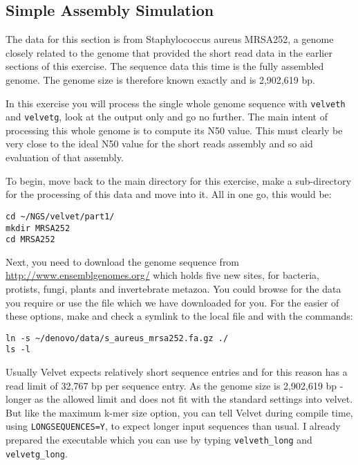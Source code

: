 \subsection{Simple Assembly Simulation}

\begin{note}
The data for this section is from Staphylococcus aureus MRSA252, a genome
closely related to the genome that provided the short read data in the earlier
sections of this exercise. The sequence data this time is the fully assembled
genome. The genome size is therefore known exactly and is 2,902,619 bp.
\end{note}

\begin{information}
In this exercise you will process the single whole genome sequence with \texttt{velveth}
and \texttt{velvetg}, look at the output only and go no further. The main intent of
processing this whole genome is to compute its N50 value. This must clearly be
very close to the ideal N50 value for the short reads assembly and so aid
evaluation of that assembly.
\end{information}

\begin{steps}
To begin, move back to the main directory for this exercise, make a
sub-directory for the processing of this data and move into it. All in one go,
this would be:
\begin{lstlisting}
cd ~/NGS/velvet/part1/ 
mkdir MRSA252 
cd MRSA252
\end{lstlisting}

Next, you need to download the genome sequence from
\url{http://www.ensemblgenomes.org/} which holds five new sites, for bacteria,
protists, fungi, plants and invertebrate metazoa. You could browse for the data
you require or use the file which we have downloaded for you. For the easier of
these options, make and check a symlink to the local file and with the
commands:
\begin{lstlisting}
ln -s ~/denovo/data/s_aureus_mrsa252.fa.gz ./
ls -l
\end{lstlisting}

\end{steps}

\begin{note}
Usually Velvet expects relatively short sequence entries and for this reason has
a read limit of 32,767 bp per sequence entry. As the genome size is 2,902,619 bp
- longer as the allowed limit and does not fit with the standard settings into
velvet. But like the maximum k-mer size option, you can tell Velvet during
compile time, using \texttt{LONGSEQUENCES=Y}, to expect longer input sequences
than usual. I already prepared the executable which you can use by typing
\texttt{velveth\_long} and \texttt{velvetg\_long}.
\end{note}

